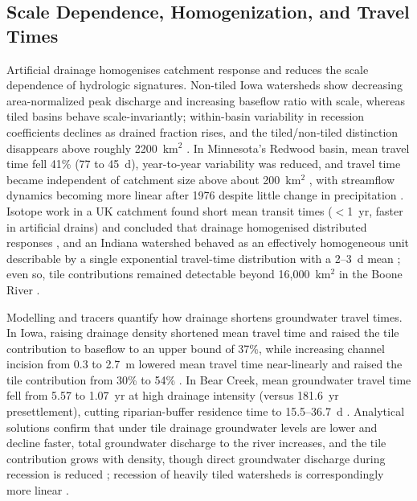 \subsection{Scale Dependence, Homogenization, and Travel Times}

Artificial drainage homogenises catchment response and reduces the scale dependence of hydrologic signatures. Non-tiled Iowa watersheds show decreasing area-normalized peak discharge and increasing baseflow ratio with scale, whereas tiled basins behave scale-invariantly; within-basin variability in recession coefficients declines as drained fraction rises, and the tiled/non-tiled distinction disappears above roughly 2200~km$^2$ \parencite{BolandBrien2014}. In Minnesota's Redwood basin, mean travel time fell 41\% (77 to 45~d), year-to-year variability was reduced, and travel time became independent of catchment size above about 200~km$^2$ \parencite{DaneshYazdi2016}, with streamflow dynamics becoming more linear after 1976 despite little change in precipitation \parencite{FoufoulaGeorgiou2015}. Isotope work in a UK catchment found short mean transit times ($<$1~yr, faster in artificial drains) and concluded that drainage homogenised distributed responses \parencite{DimitrovaPetrova2020}, and an Indiana watershed behaved as an effectively homogeneous unit describable by a single exponential travel-time distribution with a 2--3~d mean \parencite{Basu2010}; even so, tile contributions remained detectable beyond 16{,}000~km$^2$ in the Boone River \parencite{Schilling2019}.

Modelling and tracers quantify how drainage shortens groundwater travel times. In Iowa, raising drainage density shortened mean travel time and raised the tile contribution to baseflow to an upper bound of 37\%, while increasing channel incision from 0.3 to 2.7~m lowered mean travel time near-linearly and raised the tile contribution from 30\% to 54\% \parencite{Schilling2012}. In Bear Creek, mean groundwater travel time fell from 5.57 to 1.07~yr at high drainage intensity (versus 181.6~yr presettlement), cutting riparian-buffer residence time to 15.5--36.7~d \parencite{Schilling2015}. Analytical solutions confirm that under tile drainage groundwater levels are lower and decline faster, total groundwater discharge to the river increases, and the tile contribution grows with density, though direct groundwater discharge during recession is reduced \parencite{Liang2015}; recession of heavily tiled watersheds is correspondingly more linear \parencite{Schilling2008}.

